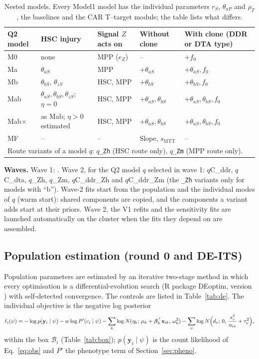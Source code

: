 \documentclass[11pt]{article}
\begin{document}
\begin{table}[!htbp]
\centering\footnotesize
\setlength{\tabcolsep}{4pt}
\caption{Nested models. Every Model1 model has the individual parameters $r_S$, $\theta_{aP}$ and $\rho_T$, the baselines and the CAR T--target module; the table lists what differs.}\label{tab:models}
\begin{tabular}{lllll}
\toprule
Q2 model & HSC injury & Signal $Z$ acts on & Without clone & With clone (DDR or DTA type)\\
\midrule
M0 & none & MPP ($e_Z$) & -- & $+f_0$\\
Ma & $\theta_{aS}$ & MPP & $+\theta_{aS}$ & $+\theta_{aS},f_0$\\
Mb & $\theta_{bS}$, $\theta_{zS}$ & HSC, MPP & $+\theta_{bS}$ & $+\theta_{bS},f_0$\\
Mab & $\theta_{aS},\theta_{bS},\theta_{zS}$; $\eta=0$ & HSC, MPP & $+\theta_{aS},\theta_{bS}$ & $+\theta_{aS},\theta_{bS},f_0$\\
Mab$\times$ & as Mab; $\eta>0$ estimated & HSC, MPP & $+\theta_{aS},\theta_{bS}$ & $+\theta_{aS},\theta_{bS},f_0$\\
MF & -- & -- & Slope, $s_{\mathrm{MTT}}$ & --\\
\midrule
\multicolumn{5}{l}{Route variants of a model $q$: $q$\texttt{\_Zh} (HSC route only), $q$\texttt{\_Zm} (MPP route only).}\\
\bottomrule
\end{tabular}
\end{table}

\textbf{Waves.} Wave 1: \valWaveOne. Wave 2, for the Q2 model $q$ selected in wave 1: $q$C\_ddr, $q$C\_dta, $q$\_Zh, $q$\_Zm, $q$C\_ddr\_Zh and $q$C\_ddr\_Zm (the \texttt{\_Zh} variants only for models with ``b''). Wave-2 fits start from the population and the individual modes of $q$ (warm start): shared components are copied, and the components a variant adds start at their priors. Wave 2, the V1 refits and the sensitivity fits are launched automatically on the cluster when the fits they depend on are assembled.

\subsection{Population estimation (round 0 and DE-ITS)}\label{sec:its}
Population parameters are estimated by an iterative two-stage method \citep{steimer1984} in which every optimisation is a differential-evolution search (R package DEoptim, version \valDEoptim) with self-detected convergence. The controls are listed in Table~\ref{tab:de}. The individual objective is the negative log posterior
\begin{equation}
\ell_i(\psi) = -\log p(\mathbf y_i\mid\psi)-w\log P'(c_i\mid\psi)-\sum_k\log N(\eta_{k};\,\mu_k+\boldsymbol\beta_k^\top\mathbf x_{ik},\,\omega_k^2)-\sum_v\log N\Bigl(d_{v};\,0,\,\frac{s_v^2}{n_{iv}}+\tau_v^2\Bigr), \label{eq:nlp}
\end{equation}
within the box $\mathcal B_i$ (Table~\ref{tab:box}); $p(\mathbf y_i\mid\psi)$ is the count likelihood of Eq.~\ref{eq:obs} and $P'$ the phenotype term of Section~\ref{sec:pheno}.
\end{document}
